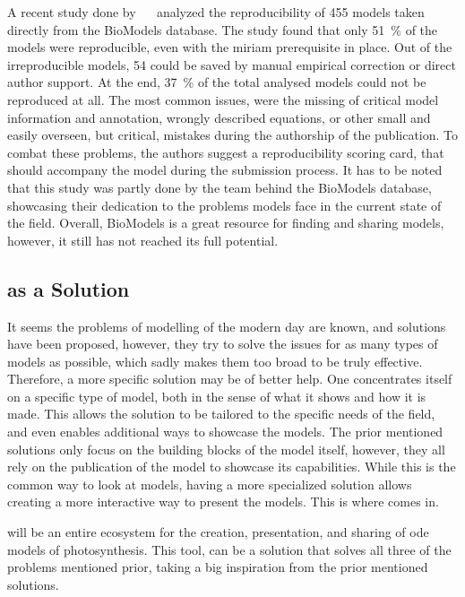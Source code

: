 A recent study done by ~\citeauthor{tiwariReproducibilitySystemsBiology2021}~\cite{tiwariReproducibilitySystemsBiology2021} analyzed the reproducibility of 455 models taken directly from the BioModels database. The study found that only \qty{51}{\percent} of the models were reproducible, even with the \gls{miriam} prerequisite in place. Out of the irreproducible models, 54 could be saved by manual empirical correction or direct author support. At the end, \qty{37}{\percent} of the total analysed models could not be reproduced at all. The most common issues, were the missing of critical model information and annotation, wrongly described equations, or other small and easily overseen, but critical, mistakes during the authorship of the publication. To combat these problems, the authors suggest a reproducibility scoring card, that should accompany the model during the submission process. It has to be noted that this study was partly done by the team behind the BioModels database, showcasing their dedication to the problems models face in the current state of the field. Overall, BioModels is a great resource for finding and sharing models, however, it still has not reached its full potential.

\subsection{\greensloth{} as a Solution}

It seems the problems of modelling of the modern day are known, and solutions have been proposed, however, they try to solve the issues for as many types of models as possible, which sadly makes them too broad to be truly effective. Therefore, a more specific solution may be of better help. One concentrates itself on a specific type of model, both in the sense of what it shows and how it is made. This allows the solution to be tailored to the specific needs of the field, and even enables additional ways to showcase the models. The prior mentioned solutions only focus on the building blocks of the model itself, however, they all rely on the publication of the model to showcase its capabilities. While this is the common way to look at models, having a more specialized solution allows creating a more interactive way to present the models. This is where \greensloth{} comes in.

\greensloth{} will be an entire ecosystem for the creation, presentation, and sharing of \gls{ode} models of photosynthesis. This tool, can be a solution that solves all three of the problems mentioned prior, taking a big inspiration from the prior mentioned solutions. 

